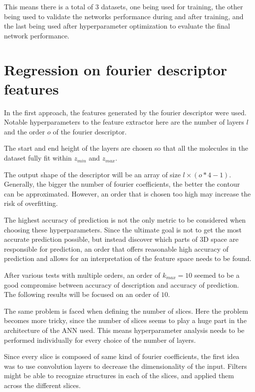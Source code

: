 This means there is a total of 3 datasets, one being used for training, the other being used to validate the networks
performance during and after training, and the last being used after hyperparameter optimization to evaluate the final network
performance.

\section{Regression on fourier descriptor features}
\label{sec:Evaluation:fourier}

In the first approach, the features generated by the fourier descriptor were used.
Notable hyperparameters to the feature extractor here are the number of layers $l$ and the order $o$ of the fourier descriptor.

The start and end height of the layers are chosen so that all the molecules in the dataset fully fit within $z_{min}$ and $z_{max}$.

The output shape of the descriptor will be an array of size $l \times (o * 4 - 1)$.
Generally, the bigger the number of fourier coefficients, the better the contour can be approximated.
However, an order that is chosen too high may increase the risk of overfitting.

The highest accuracy of prediction is not the only metric to be considered when choosing these hyperparameters.
Since the ultimate goal is not to get the most accurate prediction possible, but instead discover which parts of 3D space 
are responsible for prediction, an order that offers reasonable high accuracy of prediction and 
allows for an interpretation of the feature space needs to be found.

After various tests with multiple orders, an order of $k_{max} = 10$ seemed to be a good compromise between accuracy of description and accuracy of prediction.
The following results will be focused on an order of $10$.

The same problem is faced when defining the number of slices.
Here the problem becomes more tricky, since the number of slices seems to play a huge part in the architecture of the ANN used.
This means hyperparameter analysis needs to be performed individually for every choice of the number of layers.

Since every slice is composed of same kind of fourier coefficients, the first idea was to use convolution layers to decrease the dimensionality of the input.
Filters might be able to recognize structures in each of the slices, and applied them across the different slices.


